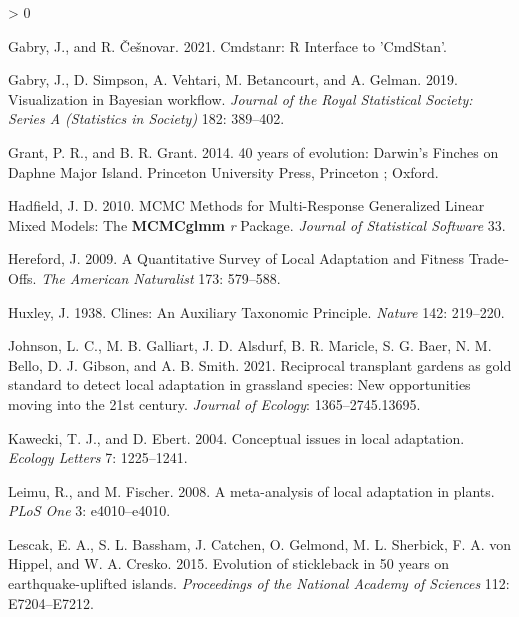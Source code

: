 \documentclass[
  12pt,
]{article}
\newlength{\cslhangindent}
\newenvironment{CSLReferences}[2] %
 {%
  \setlength{\parindent}{0pt}
  \ifodd #1 \everypar{\setlength{\hangindent}{\cslhangindent}}\ignorespaces\fi
  \ifnum #2 > 0
  \setlength{\parskip}{#2\baselineskip}
  \fi
 }%
 {}
\begin{document}
\begin{CSLReferences}{1}{0}
\leavevmode\hypertarget{ref-gabry_cmdstanr_2021}{}%
Gabry, J., and R. Češnovar. 2021. Cmdstanr: {R} {Interface} to '{CmdStan}'.

\leavevmode\hypertarget{ref-gabry_visualization_2019}{}%
Gabry, J., D. Simpson, A. Vehtari, M. Betancourt, and A. Gelman. 2019. Visualization in {Bayesian} workflow. \emph{Journal of the Royal Statistical Society: Series A (Statistics in Society)} 182: 389--402.

\leavevmode\hypertarget{ref-grant_40_2014}{}%
Grant, P. R., and B. R. Grant. 2014. 40 years of evolution: {Darwin}'s {Finches} on {Daphne} {Major} {Island}. Princeton University Press, Princeton ; Oxford.

\leavevmode\hypertarget{ref-hadfield_mcmc_2010}{}%
Hadfield, J. D. 2010. {MCMC} {Methods} for {Multi}-{Response} {Generalized} {Linear} {Mixed} {Models}: {The} \textbf{MCMCglmm} \emph{r} {Package}. \emph{Journal of Statistical Software} 33.

\leavevmode\hypertarget{ref-hereford_quantitative_2009}{}%
Hereford, J. 2009. A {Quantitative} {Survey} of {Local} {Adaptation} and {Fitness} {Trade}‐{Offs}. \emph{The American Naturalist} 173: 579--588.

\leavevmode\hypertarget{ref-huxley_clines_1938}{}%
Huxley, J. 1938. Clines: An {Auxiliary} {Taxonomic} {Principle}. \emph{Nature} 142: 219--220.

\leavevmode\hypertarget{ref-johnson_reciprocal_2021}{}%
Johnson, L. C., M. B. Galliart, J. D. Alsdurf, B. R. Maricle, S. G. Baer, N. M. Bello, D. J. Gibson, and A. B. Smith. 2021. Reciprocal transplant gardens as gold standard to detect local adaptation in grassland species: {New} opportunities moving into the 21st century. \emph{Journal of Ecology}: 1365--2745.13695.

\leavevmode\hypertarget{ref-kawecki_conceptual_2004}{}%
Kawecki, T. J., and D. Ebert. 2004. Conceptual issues in local adaptation. \emph{Ecology Letters} 7: 1225--1241.

\leavevmode\hypertarget{ref-leimu_meta-analysis_2008}{}%
Leimu, R., and M. Fischer. 2008. A meta-analysis of local adaptation in plants. \emph{PLoS One} 3: e4010--e4010.

\leavevmode\hypertarget{ref-lescak_evolution_2015}{}%
Lescak, E. A., S. L. Bassham, J. Catchen, O. Gelmond, M. L. Sherbick, F. A. von Hippel, and W. A. Cresko. 2015. Evolution of stickleback in 50 years on earthquake-uplifted islands. \emph{Proceedings of the National Academy of Sciences} 112: E7204--E7212.


\end{CSLReferences}
\end{document}

